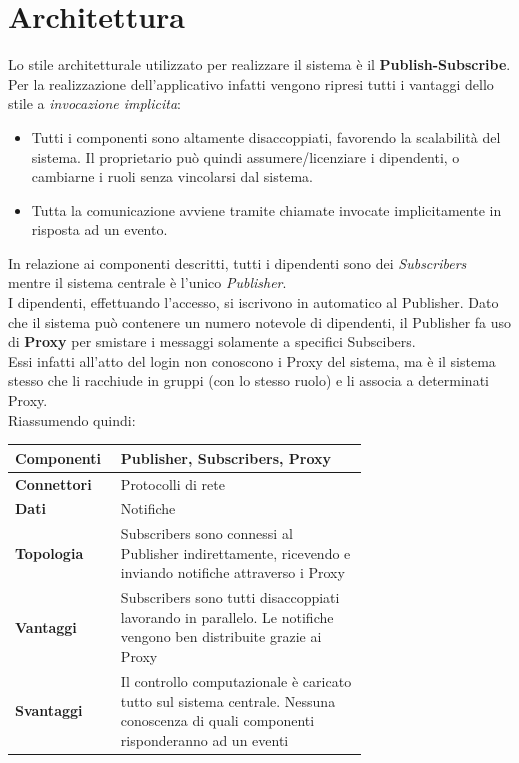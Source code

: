 \section{Architettura}
Lo stile architetturale utilizzato per realizzare il sistema  è il \textbf{Publish-Subscribe}. Per la realizzazione dell'applicativo infatti vengono ripresi tutti i vantaggi dello stile a \textit{invocazione implicita}:
\begin{itemize}
	\item Tutti i componenti sono altamente disaccoppiati, favorendo la scalabilità del sistema. Il proprietario può quindi assumere/licenziare i dipendenti, o cambiarne i ruoli senza vincolarsi dal sistema.
	\item Tutta la comunicazione avviene tramite chiamate invocate implicitamente in risposta ad un evento.
\end{itemize}
In relazione ai componenti descritti, tutti i dipendenti sono dei \textit{Subscribers} mentre il sistema centrale è l'unico \textit{Publisher}.
\\I dipendenti, effettuando l'accesso, si iscrivono in automatico al Publisher.
Dato che il sistema può contenere un numero notevole di dipendenti, il Publisher fa uso di \textbf{Proxy} per smistare i messaggi solamente a specifici Subscibers.
\\Essi infatti all'atto del login non conoscono i Proxy del sistema, ma è il sistema stesso che li racchiude in gruppi (con lo stesso ruolo) e li associa a determinati Proxy.
\\Riassumendo quindi:
\begin{table}[H]
	\centering
	\begin{tabular}{|l | p{0.7\linewidth} |}
		\hline
		\textbf{Componenti} & Publisher, Subscribers, 
		Proxy \\
		\hline
		\textbf{Connettori} & Protocolli di rete \\
		\hline
		\textbf{Dati} & Notifiche \\
		\hline
		\textbf{Topologia} & Subscribers sono connessi al Publisher indirettamente, ricevendo e inviando notifiche attraverso i Proxy \\
		\hline
		\textbf{Vantaggi} & Subscribers sono tutti disaccoppiati lavorando in parallelo. Le notifiche vengono ben distribuite grazie ai Proxy \\
		\hline
		\textbf{Svantaggi} & Il controllo computazionale è caricato tutto sul sistema centrale. Nessuna conoscenza di quali componenti risponderanno ad un eventi \\
		\hline
	\end{tabular}
\end{table}


